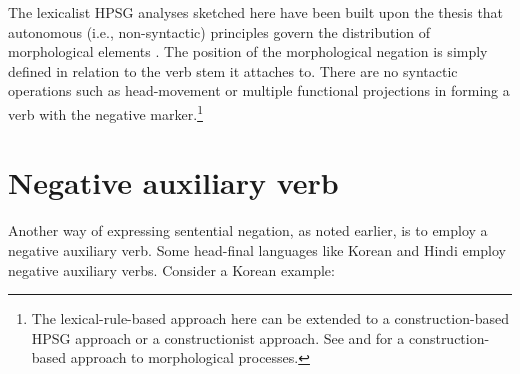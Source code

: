 \documentclass[output=paper
                ,modfonts
                ,nonflat
	        ,collection
	        ,collectionchapter
	        ,collectiontoclongg
 	        ,biblatex
                ,babelshorthands
                ,newtxmath
                ,draftmode
                ,colorlinks, citecolor=brown
]{./langsci/langscibook}
\begin{document}
{\begin{exe}
\begin{xlist}
\begin{exe}
\begin{xlist}
\iffalse{
In the
construction-based HPSG, we could take this as an inflectional
construction.  The negative marker, as we have seen in Turkish and Japanese, is realized as a suffix
attached to the verb root. The resulting combination is not
a word-level entity but a verb stem to which an aspectual or tense marker can be attached. We could thus take such a morphological process as an inflectional
one. For instance, Figure~\ref{negation-fig:2} could be a morphological
construction in Turkish.\footnote{See \citet{Sag:12} and \citet{Hilpert:16} for a construction-based approach to
inflectional as well as derivational processes.}


This inflectional construction ($\uparrow$\textit{infl-cxt}) allows us to generate a Turkish inflection construct like \textit{ser-me} `like-\NEG' (in (\ref{negation-1a})) from the v-lexeme \textit{ser-} with the change in the root's meaning into a sentential negation. The morphological function \textit{F}\jbsub{\textsc{neg}} could ensure that the vowel of the negative affix \textit{me} is subject to phonological changes depending on its environment. If it is followed by a consonant-initial morpheme, it undergoes vowel harmony with the vowel in the preceding syllable (e.g., \textit{yika-n-ma-di} `wash-\REFL-\NEG-\PST'). If it is followed by a vowel-initial morpheme, its vowel drops (gel-m-iyor `come-\NEG-\PROG')  \citep[see]{kelepir}.\footnote{As
 for a way of capturing the ordering of suffixes within this kind of system,
 see \citet{Kim:16}.}
}\fi

The lexicalist HPSG analyses sketched here
 have been built upon the
thesis that autonomous (i.e., non-syntactic) principles govern the
distribution of morphological elements \citep{BM:95}.
The position of the morphological negation is simply
defined in relation to
the verb stem it attaches to. There are no syntactic operations such
as head-movement or multiple functional projections in forming
a verb with the negative marker.\footnote{The lexical-rule-based
approach here can be extended to a construction-based HPSG
approach or a constructionist approach. See
\citet{Sag:12} and \citet{Hilpert:16} for a construction-based
approach to morphological processes.}



\section{Negative auxiliary verb}

Another way of expressing sentential negation, as noted earlier, is to employ
a negative auxiliary
verb. Some head-final languages like Korean and Hindi employ
negative auxiliary verbs. Consider a Korean example:


\end{xlist}
\end{exe}
\end{xlist}
\end{exe}}
\end{document}
